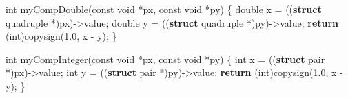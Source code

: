 \documentclass[
  12pt,
  letterpaper,
  DIV=11,
  numbers=noendperiod]{scrreprt}
\newenvironment{Shaded}{\begin{snugshade}}{\end{snugshade}}
\newcommand{\ControlFlowTok}[1]{\textcolor[rgb]{0.00,0.23,0.31}{\textbf{#1}}}
\newcommand{\DataTypeTok}[1]{\textcolor[rgb]{0.68,0.00,0.00}{#1}}
\newcommand{\FloatTok}[1]{\textcolor[rgb]{0.68,0.00,0.00}{#1}}
\newcommand{\KeywordTok}[1]{\textcolor[rgb]{0.00,0.23,0.31}{\textbf{#1}}}
\newcommand{\NormalTok}[1]{\textcolor[rgb]{0.00,0.23,0.31}{#1}}
\newcommand{\OperatorTok}[1]{\textcolor[rgb]{0.37,0.37,0.37}{#1}}
\theoremstyle{remark}
\begin{document}
\begin{Shaded}
\begin{Highlighting}[]
\DataTypeTok{int}\NormalTok{ myCompDouble}\OperatorTok{(}\DataTypeTok{const} \DataTypeTok{void} \OperatorTok{*}\NormalTok{px}\OperatorTok{,} \DataTypeTok{const} \DataTypeTok{void} \OperatorTok{*}\NormalTok{py}\OperatorTok{)} \OperatorTok{\{}
    \DataTypeTok{double}\NormalTok{ x }\OperatorTok{=} \OperatorTok{((}\KeywordTok{struct}\NormalTok{ quadruple }\OperatorTok{*)}\NormalTok{px}\OperatorTok{){-}\textgreater{}}\NormalTok{value}\OperatorTok{;}
    \DataTypeTok{double}\NormalTok{ y }\OperatorTok{=} \OperatorTok{((}\KeywordTok{struct}\NormalTok{ quadruple }\OperatorTok{*)}\NormalTok{py}\OperatorTok{){-}\textgreater{}}\NormalTok{value}\OperatorTok{;}
    \ControlFlowTok{return} \OperatorTok{(}\DataTypeTok{int}\OperatorTok{)}\NormalTok{copysign}\OperatorTok{(}\FloatTok{1.0}\OperatorTok{,}\NormalTok{ x }\OperatorTok{{-}}\NormalTok{ y}\OperatorTok{);}
\OperatorTok{\}}

\DataTypeTok{int}\NormalTok{ myCompInteger}\OperatorTok{(}\DataTypeTok{const} \DataTypeTok{void} \OperatorTok{*}\NormalTok{px}\OperatorTok{,} \DataTypeTok{const} \DataTypeTok{void} \OperatorTok{*}\NormalTok{py}\OperatorTok{)} \OperatorTok{\{}
    \DataTypeTok{int}\NormalTok{ x }\OperatorTok{=} \OperatorTok{((}\KeywordTok{struct}\NormalTok{ pair }\OperatorTok{*)}\NormalTok{px}\OperatorTok{){-}\textgreater{}}\NormalTok{value}\OperatorTok{;}
    \DataTypeTok{int}\NormalTok{ y }\OperatorTok{=} \OperatorTok{((}\KeywordTok{struct}\NormalTok{ pair }\OperatorTok{*)}\NormalTok{py}\OperatorTok{){-}\textgreater{}}\NormalTok{value}\OperatorTok{;}
    \ControlFlowTok{return} \OperatorTok{(}\DataTypeTok{int}\OperatorTok{)}\NormalTok{copysign}\OperatorTok{(}\FloatTok{1.0}\OperatorTok{,}\NormalTok{ x }\OperatorTok{{-}}\NormalTok{ y}\OperatorTok{);}
\OperatorTok{\}}


\end{Highlighting}
\end{Shaded}
\end{document}
